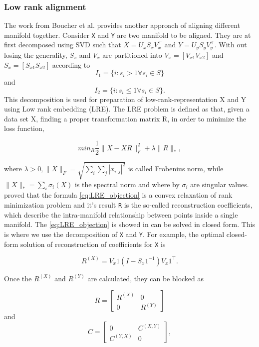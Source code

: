   \subsubsection{Low rank alignment}
  The work from Boucher et al. \cite{boucher2015aligning} provides another approach of aligning different manifold together. Consider \verb|X| and \verb|Y| are two manifold to be aligned. They are at first decomposed using SVD such that $X=U_xS_xV_x^\intercal$ and $Y=U_yS_yV_y^\intercal$. With out losing the generality, $S_x$ and $V_x$ are partitioned into $V_x=[V_{x1}V_{x2}]$ and $S_x=[S_{x1}S_{x2}]$ according to 
  $$
  I_1=\{i:s_i>1 \forall s_i \in S\}
  $$
  and
  $$
  I_2=\{i:s_i\leq 1 \forall s_i\in S\}.
  $$ 
  This decomposition is used for preparation of low-rank-representation X and Y using Low rank embedding (LRE). The LRE problem is defined as that, given a data set X, finding a proper transformation matrix R, in order to minimize the loss function,

  \begin{equation}\label{eq:LRE_objection}
  min_R\frac{1}{2}\|X-XR\|^2_F+\lambda\|R\|_*,
  \end{equation}

  where $\lambda > 0, \|X\|_F=\sqrt{\sum_i\sum_j|x_{i,j}|^2}$ is called Frobenius norm, while $\|X\|_*=\sum_i\sigma_i(X)$ is the spectral norm and where by $\sigma_i$ are singular values. \cite{candes2010power} proved that the formula \eqref{eq:LRE_objection} is a convex relaxation of rank minimization problem and it's result \verb|R| is the so-called reconstruction coefficients, which describe the intra-manifold relationship between points inside a single manifold. The \eqref{eq:LRE_objection} is showed in \cite{favaro2011closed} can be solved in closed form. This is where we use the decomposition of \verb|X| and \verb|Y|. For example, the optimal closed-form solution of reconstruction of coefficients for \verb|X| is
  
  \begin{equation}
  R^{(X)}=V_x1(I-S_x1^{-1})V_x1^\intercal.
  \end{equation}

  Once the $R^{(X)}$ and $R^{(Y)}$ are calculated, they can be blocked as
  
  \[R= \begin{bmatrix}
      R^{(X)} & 0 \\
      0 & R^{(Y)}
      \end{bmatrix}\] and 
  \[C=\begin{bmatrix}
      0 & C^{(X,Y)}\\
      C^{(Y,X)} & 0
      \end{bmatrix},\]

